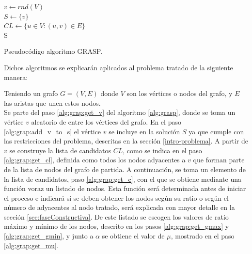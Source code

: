 \begin{algorithm}[H]
	\SetAlgoLined
	$ v \gets rnd( V ) $ \label{alg:grap:get_v} \\[0.2cm]
	$ S \gets \{ v \} $ \label{alg:grap:add_v_to_s} \\[0.2cm]
	$ CL \gets \{u \in V : (u, v) \in E\} $ \label{alg:grap:get_cl} \\[0.2cm]
	\Return S \label{alg:grap:rt_s}
	\caption{Pseudocódigo algoritmo GRASP.}
	\label{alg:grasp}
\end{algorithm}

Dichos algoritmos se explicarán aplicados al problema tratado de la siguiente manera:

Teniendo un grafo $G=(V, E)$ donde $V$ son los vértices o nodos del grafo, y $E$ las aristas que unen estos nodos.\\
Se parte del paso \ref{alg:grap:get_v} del algoritmo \ref{alg:grasp}, donde se toma un vértice $v$ aleatorio de entre los vértices del grafo. En el paso \ref{alg:grap:add_v_to_s} el vértice $v$ se incluye en la solución $S$ ya que cumple con las restricciones del problema, descritas en la sección \ref{intro-problema}. A partir de $v$ se construye la lista de candidatos $CL$, como se indica en el paso \ref{alg:grap:get_cl}, definida como todos los nodos adyacentes a $v$ que forman parte de la lista de nodos del grafo de partida. A continuación, se toma un elemento de la lista de candidatos, paso \ref{alg:grap:get_c}, con el que se obtiene mediante una función voraz un listado de nodos. Esta función será determinada antes de iniciar el proceso e indicará si se deben obtener los nodos según su ratio o según el número de adyacentes al nodo tratado, será explicada con mayor detalle en la sección \ref{sec:faseConstructiva}. De este listado se escogen los valores de ratio máximo y mínimo de los nodos, descrito en los pasos \ref{alg:grap:get_gmax} y \ref{alg:grap:get_gmin}, y junto a $\alpha$ se obtiene el valor de $\mu$, mostrado en el paso \ref{alg:grap:get_mu}.

